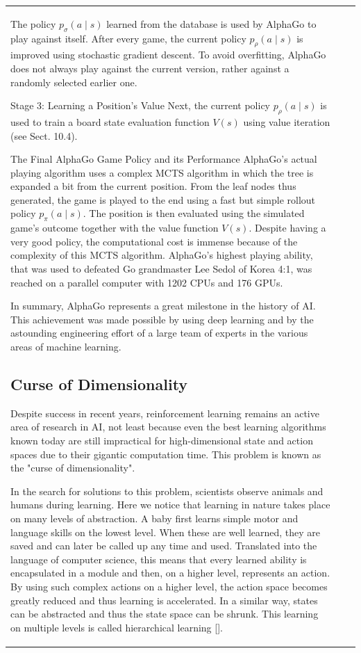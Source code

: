 \documentclass[10pt]{book}
\begin{document}
\begin{center}
\begin{tabular}{|l|l|l|}
The policy $p_{\sigma}(a \mid s)$ learned from the database is used by AlphaGo to play against itself. After every game, the current policy $p_{\rho}(a \mid s)$ is improved using stochastic gradient descent. To avoid overfitting, AlphaGo does not always play against the current version, rather against a randomly selected earlier one.

Stage 3: Learning a Position's Value Next, the current policy $p_{\rho}(a \mid s)$ is used to train a board state evaluation function $V(s)$ using value iteration (see Sect. 10.4).

The Final AlphaGo Game Policy and its Performance AlphaGo's actual playing algorithm uses a complex MCTS algorithm in which the tree is expanded a bit from the current position. From the leaf nodes thus generated, the game is played to the end using a fast but simple rollout policy $p_{\pi}(a \mid s)$. The position is then evaluated using the simulated game's outcome together with the value function $V(s)$. Despite having a very good policy, the computational cost is immense because of the complexity of this MCTS algorithm. AlphaGo's highest playing ability, that was used to defeated Go grandmaster Lee Sedol of Korea 4:1, was reached on a parallel computer with 1202 CPUs and 176 GPUs.

In summary, AlphaGo represents a great milestone in the history of AI. This achievement was made possible by using deep learning and by the astounding engineering effort of a large team of experts in the various areas of machine learning.

\subsection{Curse of Dimensionality}
Despite success in recent years, reinforcement learning remains an active area of research in AI, not least because even the best learning algorithms known today are still impractical for high-dimensional state and action spaces due to their gigantic computation time. This problem is known as the "curse of dimensionality".

In the search for solutions to this problem, scientists observe animals and humans during learning. Here we notice that learning in nature takes place on many levels of abstraction. A baby first learns simple motor and language skills on the lowest level. When these are well learned, they are saved and can later be called up any time and used. Translated into the language of computer science, this means that every learned ability is encapsulated in a module and then, on a higher level, represents an action. By using such complex actions on a higher level, the action space becomes greatly reduced and thus learning is accelerated. In a similar way, states can be abstracted and thus the state space can be shrunk. This learning on multiple levels is called hierarchical learning [\cite{bm03}].


\end{tabular}
\end{center}
\end{document}
